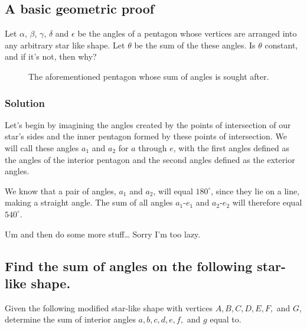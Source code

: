 \documentclass{article}
\newcommand{\solution}{\subsubsection*{\textcolor{MainColor}{Solution}}}
\theoremstyle{maintheorem}
\begin{document}
\subsection{
    A basic geometric proof
}
Let $\alpha$, $\beta$, $\gamma$, $\delta$ and $\epsilon$ be the angles of a pentagon
whose vertices are arranged into any arbitrary star like shape.
Let $\theta$ be the sum of the these angles.
Is $\theta$ constant, and if it's not, then why?

\begin{figure}[h]\label{star}
    \centering

    \caption{The aforementioned pentagon whose sum of angles is sought after.}
\end{figure}

\solution

Let's begin by imagining the angles created by the points of intersection of our star's sides
and the inner pentagon formed by these points of intersection.
We will call these angles $a_1$ and $a_2$ for $a$ through $e$,
with the first angles defined as the angles of the interior pentagon and the second angles defined as the exterior angles.

We know that a pair of angles, $a_1$ and $a_2$, will equal $180^\circ$, since they lie on a line, making a straight angle.
The sum of all angles $a_1$-$e_1$ and $a_2$-$e_2$ will therefore equal $540^\circ$.

Um and then do some more stuff\dots
Sorry I'm too lazy.

\subsection{
    Find the sum of angles on the following star-like shape.
}
Given the following modified star-like shape with vertices $A, B, C, D, E, F,$ and $G$,
determine the sum of interior angles $a, b, c, d, e, f,$ and $g$ equal to.
\end{document}
